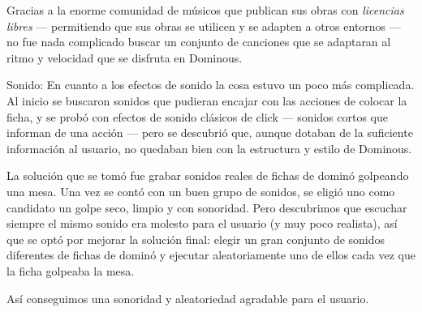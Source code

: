         Gracias a la enorme comunidad de músicos que publican sus obras con \emph{licencias libres}
        --- permitiendo que sus obras se utilicen y se adapten a otros entornos --- no fue nada complicado buscar
        un conjunto de canciones que se adaptaran al ritmo y velocidad que se disfruta en Dominous.

Sonido: En cuanto a los efectos de sonido la cosa estuvo un poco más complicada. Al inicio se buscaron sonidos que
        pudieran encajar con las acciones de colocar la ficha, y se probó con efectos de sonido clásicos de click --- sonidos
        cortos que informan de una acción --- pero se descubrió que, aunque dotaban de la suficiente información
        al usuario, no quedaban bien con la estructura y estilo de Dominous. 

        La solución que se tomó fue grabar sonidos reales de fichas de dominó golpeando una mesa. Una vez se contó con
        un buen grupo de sonidos, se eligió uno como candidato un golpe seco, limpio y con sonoridad. Pero descubrimos
        que escuchar siempre el mismo sonido era molesto para el usuario (y muy poco realista), así que se optó por mejorar
        la solución final: elegir un gran conjunto de sonidos diferentes de fichas de dominó y ejecutar aleatoriamente
        uno de ellos cada vez que la ficha golpeaba la mesa. 
        
        Así conseguimos una sonoridad y aleatoriedad agradable para el usuario.
